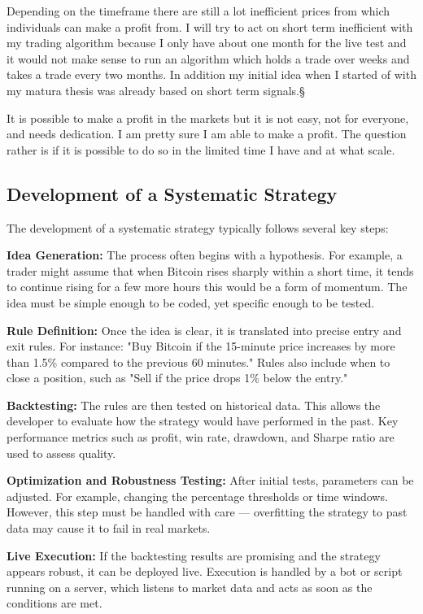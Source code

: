 \documentclass[12pt]{article}
\begin{document}
Depending on the timeframe there are still a lot inefficient prices from which individuals can make a profit from. I will try to act on short term inefficient with my trading algorithm because I only have about one month for the live test and it would not make sense to run an algorithm which holds a trade over weeks and takes a trade every two months. In addition my initial idea when I started of with my matura thesis was already based on short term signals.§

It is possible to make a profit in the markets but it is not easy, not for everyone, and needs dedication. I am pretty sure I am able to make a profit. The question rather is if it is possible to do so in the limited time I have and at what scale.


\newpage

\subsection{Development of a Systematic Strategy}


The development of a systematic strategy typically follows several key steps:

\textbf{Idea Generation:}  
The process often begins with a hypothesis. For example, a trader might assume that when Bitcoin rises sharply within a short time, it tends to continue rising for a few more hours this would be a form of momentum. The idea must be simple enough to be coded, yet specific enough to be tested.

\textbf{Rule Definition:}  
Once the idea is clear, it is translated into precise entry and exit rules. For instance: "Buy Bitcoin if the 15-minute price increases by more than 1.5\% compared to the previous 60 minutes." Rules also include when to close a position, such as "Sell if the price drops 1\% below the entry."

\textbf{Backtesting:}  
The rules are then tested on historical data. This allows the developer to evaluate how the strategy would have performed in the past. Key performance metrics such as profit, win rate, drawdown, and Sharpe ratio are used to assess quality.

\textbf{Optimization and Robustness Testing:}  
After initial tests, parameters can be adjusted. For example, changing the percentage thresholds or time windows. However, this step must be handled with care — overfitting the strategy to past data may cause it to fail in real markets.

\textbf{Live Execution:}  
If the backtesting results are promising and the strategy appears robust, it can be deployed live. Execution is handled by a bot or script running on a server, which listens to market data and acts as soon as the conditions are met.
\end{document}
